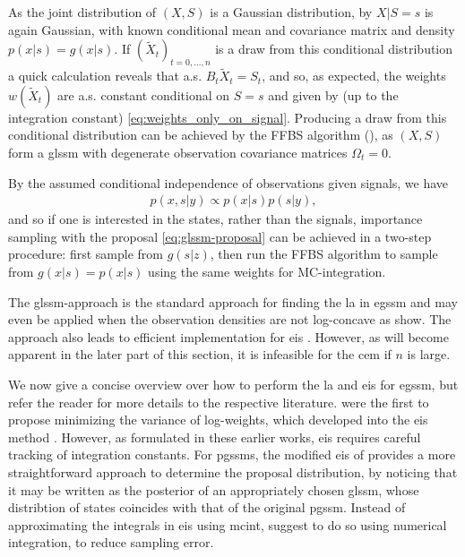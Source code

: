 As the joint distribution of $(X, S)$ is a Gaussian distribution, by  $X|S = s$ is again Gaussian,
with known conditional mean and covariance matrix and density $p(x|s) = g(x|s)$. If $(\tilde X_{t})_{t=0,\dots,n}$ is a draw from this conditional distribution a quick calculation reveals that a.s. $B_{t} \tilde X_{t} = S_{t}$, and so, as expected, the weights $w(\tilde X_{t})$ are a.s. constant conditional on $S=s$ and given by (up to the integration constant) \eqref{eq:weights_only_on_signal}. Producing a draw from this conditional distribution can be achieved by the FFBS algorithm (), as $(X, S)$ form a \gls{glssm} with degenerate observation covariance matrices $\Omega_{t} = 0$.

By the assumed conditional independence of observations given signals, we have
\begin{align}
\label{eq:two_step_sample_ssms}
p(x, s|y) \propto p(x|s) p(s|y),
\end{align}
and so if one is interested in the states, rather than the signals, importance sampling with the proposal \eqref{eq:glssm-proposal} can be achieved in a two-step procedure: first sample from $g(s|z)$, then run the FFBS algorithm to sample from $g(x|s) = p(x|s)$ using the same weights for MC-integration. 

The \gls{glssm}-approach is the standard approach for finding the \gls{la} in \gls{egssm} \citep{Durbin1997Monte,Durbin2012Time} and may even be applied when the observation densities are not log-concave as \citep{Jungbacker2007Monte} show. The approach also leads to efficient implementation for \gls{eis} \citep{Koopman2019Modified}. However, as will become apparent in the later part of this section, it is infeasible for the \gls{cem} if $n$ is large. 

We now give a concise overview over how to perform the \gls{la} and \gls{eis} for \gls{egssm}, but refer the reader for more details to the respective literature.
\citep{Danielsson1993Accelerateda} were the first to propose minimizing the variance of log-weights, which developed into the \gls{eis} method \citep{Liesenfeld2003Univariate, Richard2007Efficient}. However, as formulated in these earlier works, \gls{eis} requires careful tracking of integration constants.  For \glspl{pgssm}, the modified \gls{eis} of \citep{Koopman2019Modified} provides a more straightforward approach to determine the proposal distribution, by noticing that it may be written as the posterior of an appropriately chosen \gls{glssm}, whose distribtion of states coincides with that of the original \gls{pgssm}. Instead of approximating the integrals in \gls{eis} using \gls{mcint}, \citep{Koopman2015Numerically} suggest to do so using numerical integration, to reduce sampling error.

